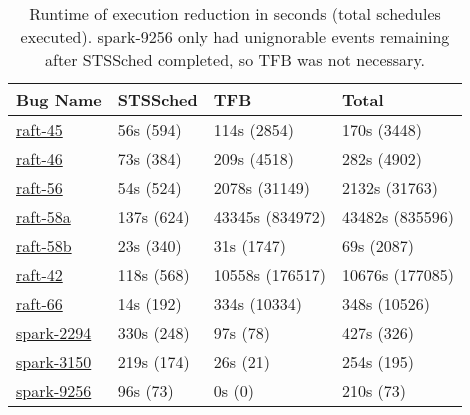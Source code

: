\begin{table}
\centering
\begin{tabular}{|l|l|l||l|}
  \cline{1-4}
  \textbf{Bug Name} &
  \textbf{STSSched} & \textbf{TFB} & \textbf{Total} \\\cline{1-4} \hline
\href{https://docs.google.com/document/d/1alldH4lRSpFQ55-YCNFaIcMpjxrBOMNaB7R_9eEVwfs}{raft-45}
& 56s \hfill (594) & 114s \hfill (2854) & 170s (3448) \\
\href{https://docs.google.com/document/d/1vhGftMIlmm_uFLmCz2GI0CCPmttDUR617hJ72k2BTbY}{raft-46}
& 73s \hfill (384) & 209s \hfill (4518) & 282s (4902) \\
\href{https://docs.google.com/document/d/1_UPKhjYoSrG9p4FQXqML_WQKa3WNbM2fch2aa0V-9Go}{raft-56}
& 54s \hfill (524) & 2078s \hfill (31149) & 2132s (31763) \\
\href{https://docs.google.com/document/d/1_efq5rbOGCG3sG-2qxbbOeIRztW9XYP6xgyh0QFmWXg}{raft-58a}
& 137s \hfill (624) & 43345s \hfill (834972) & 43482s (835596) \\
\href{https://docs.google.com/document/d/1eERBdohTC3UidHJ6cZq12ixpp_eiVqzT7LvzuTeEtR4}{raft-58b}
& 23s \hfill (340) & 31s \hfill (1747) & 69s (2087) \\ %
\href{https://docs.google.com/document/d/1BN4hpTKtN_-inqyT5XTGogI8QSlohnP2Y7A01nuW7TI}{raft-42}
& 118s \hfill (568) & 10558s \hfill (176517) & 10676s (177085) \\
\href{https://docs.google.com/document/d/1lCAR_IE_U27CA-VTlPCi4Kyxf4h6Ykx-0zbkHe0Gfbg}{raft-66}
& 14s \hfill (192) & 334s \hfill (10334) & 348s (10526) \\ %
\href{https://docs.google.com/document/d/1JQiaLlm6XwLCWKOBOFkaMzg8Gd7NT5gDH3_8OV-oekY}{spark-2294}
& 330s \hfill (248) & 97s \hfill (78) & 427s (326) \\


\href{https://docs.google.com/document/d/1mWbxS2-B0v4fbY_FIASs6HCmAXFh6K89DMYX-XEmeL8}{spark-3150}
& 219s \hfill (174) & 26s \hfill (21) & 254s (195) \\ %
\href{https://docs.google.com/document/d/1rPseAbo3FELT8Fj2lrRUMkrDmjLPYI26Jgr8goAMLzU}{spark-9256}
& 96s \hfill (73) & 0s \hfill (0) & 210s (73) \\
\hline
\end{tabular}
\caption{Runtime of execution reduction in seconds (total schedules executed). spark-9256 only
had unignorable events remaining after STSSched completed, so TFB was not
necessary.}
\label{tab:runtime}
\end{table}

